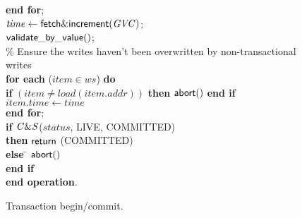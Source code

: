 \documentclass[11pt,letterpaper]{article}
\begin{document}
\begin{figure} [htb]
{{\begin{minipage}[t]{150mm}
\begin{tabbing}
 \> {\bf end for}; \\

 \> $\mathit{time} \gets {\sf fetch\&increment}(\mathit{GVC})$; \\

 \> ${\sf validate\_by\_value}()$;  \\


\> \% Ensure the writes haven't been overwritten by non-transactional writes \\
 \> 
{\bf for each} ($\mathit{item} \in \mathit{ws}$) {\bf do} \\

 \>\> {\bf if} $(\mathit{item} \neq load(\mathit{item.addr}))$  
                 {\bf then}  
                   ${\sf abort}()$ 
                {\bf end if} \\
 \>\> $\mathit{item.time} \gets \mathit{time}$ \\
 \> {\bf end for}; \\
 \> {\bf if} ${\sf \mathit{C\&S}}$($\mathit{status}$, LIVE, COMMITTED) \\
 \>\> {\bf then} \> ${\sf return}$ (COMMITTED)\\
 \> \> {\bf else} \= ${\sf abort}()$ \\
 \> {\bf end if}  \\
{\bf end operation}.

\end{tabbing}
\normalsize
\end{minipage}
}
\caption{Transaction begin/commit.}
\label{fig:tbc}
}
\end{figure}
\end{document}
